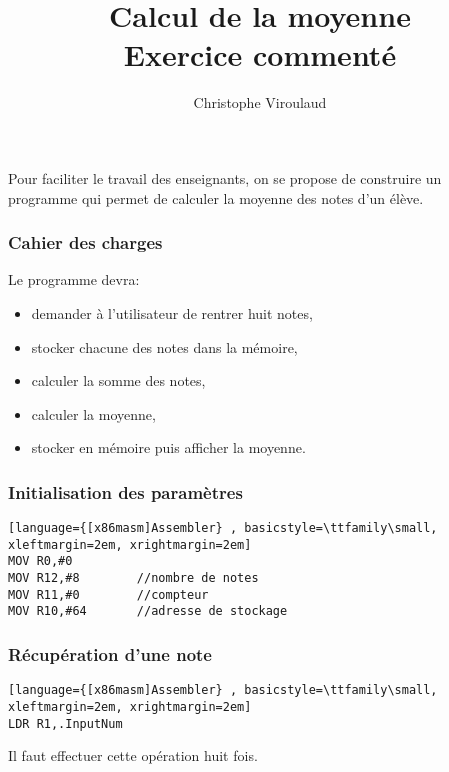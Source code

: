 \documentclass[svgnames,11pt]{beamer}
\author[]{Christophe Viroulaud}
\title{Calcul de la moyenne\\Exercice commenté}
\date{\framebox{\textbf{ArchMat 04}}}
\institute{Première - NSI}
\begin{document}
\begin{frame}
\titlepage
\end{frame}
\begin{frame}
    \frametitle{}

Pour faciliter le travail des enseignants, on se propose de construire un programme qui permet de calculer la moyenne des notes d'un élève.

\end{frame}
\begin{frame}
    \frametitle{Cahier des charges}

Le programme devra:
\begin{itemize}
    \item demander à l'utilisateur de rentrer huit notes,
    \item stocker chacune des notes dans la mémoire,
    \item calculer la somme des notes,
    \item calculer la moyenne,
    \item stocker en mémoire puis afficher la moyenne.
\end{itemize}

\end{frame}
\begin{frame}[fragile]
    \frametitle{Initialisation des paramètres}

\begin{center}
\begin{lstlisting}[language={[x86masm]Assembler} , basicstyle=\ttfamily\small, xleftmargin=2em, xrightmargin=2em]
MOV R0,#0
MOV R12,#8        //nombre de notes
MOV R11,#0        //compteur
MOV R10,#64       //adresse de stockage
\end{lstlisting}
\end{center}

\end{frame}
\begin{frame}[fragile]
    \frametitle{Récupération d'une note}

\begin{center}
\begin{lstlisting}[language={[x86masm]Assembler} , basicstyle=\ttfamily\small, xleftmargin=2em, xrightmargin=2em]
LDR R1,.InputNum
\end{lstlisting}
\end{center}
\begin{aretenir}[Commentaire]
Il faut effectuer cette opération huit fois.
\end{aretenir}
\end{frame}
\end{document}
